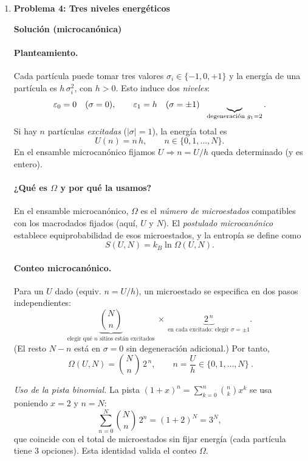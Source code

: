 \documentclass{article}
\begin{document}
\begin{enumerate}[label={{\textcolor{trueblue}{\textbf{Ej}. \arabic*.0}}}, start=4]
\item \textbf{Problema 4: Tres niveles energéticos}

\textcolor{Cinnabar}{\textbf{Solución (microcanónica)}}

\paragraph{Planteamiento.}
Cada partícula puede tomar tres valores \(\sigma_i\in\{-1,0,+1\}\) y la energía de una partícula es \(h\,\sigma_i^2\), con \(h>0\).
Esto induce dos \emph{niveles}:
\[
\varepsilon_0=0\quad(\sigma=0),\qquad
\varepsilon_1=h\quad(\sigma=\pm1)\ \ \underbrace{\vphantom{\large A}}_{\text{degeneración }g_1=2}.
\]
Si hay \(n\) partículas \emph{excitadas} (\(|\sigma|=1\)), la energía total es
\[
U(n)=n\,h,\qquad n\in\{0,1,\dots,N\}.
\]
En el ensamble microcanónico fijamos \(U\Rightarrow n=U/h\) queda determinado (y es entero).

\paragraph{¿Qué es \(\Omega\) y por qué la usamos?}
En el ensamble microcanónico, \(\Omega\) es el \emph{número de microestados} compatibles con los macrodados fijados (aquí, \(U\) y \(N\)).
El \emph{postulado microcanónico} establece equiprobabilidad de esos microestados, y la entropía se define como
\[
S(U,N)=k_B\ln\Omega(U,N).
\]

\paragraph{Conteo microcanónico.}
Para un \(U\) dado (equiv. \(n=U/h\)), un microestado se especifica en dos pasos independientes:
\[
\underbrace{\binom{N}{n}}_{\text{elegir qué $n$ sitios están excitados}}
\ \times\
\underbrace{2^{\,n}}_{\text{en cada excitado: elegir }\sigma=\pm1}.
\]
(El resto \(N-n\) está en \(\sigma=0\) sin degeneración adicional.) Por tanto,
\begin{equation*}
\boxed{\ \Omega(U,N)=\binom{N}{\,n\,}\,2^{\,n},\qquad n=\frac{U}{h}\in\{0,1,\dots,N\}\ }.
\end{equation*}

\noindent\textit{Uso de la pista binomial.}
La pista \((1+x)^n=\sum_{k=0}^n\binom{n}{k}x^k\) se usa poniendo \(x=2\) y \(n=N\):
\[
\sum_{n=0}^{N}\binom{N}{n}\,2^{n}
=(1+2)^N=3^N,
\]
que coincide con el total de microestados sin fijar energía (cada partícula tiene 3 opciones). Esta identidad valida el conteo \(\Omega\).


\end{enumerate}
\end{document}
